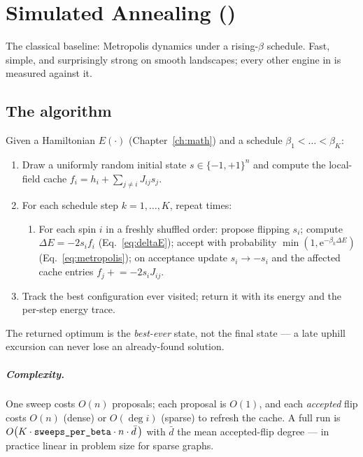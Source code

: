 \chapter{Simulated Annealing ()}
\label{ch:sa}

The classical baseline: Metropolis dynamics under a rising-$\beta$ schedule.
Fast, simple, and surprisingly strong on smooth landscapes; every other
engine in \qv{} is measured against it.

\section{The algorithm}

Given a Hamiltonian $E(\cdot)$ (Chapter~\ref{ch:math}) and a schedule
$\beta_1<\dots<\beta_K$:

\begin{keyeq}
\begin{enumerate}
\item Draw a uniformly random initial state $s\in\{-1,+1\}^n$ and compute the
local-field cache $f_i=h_i+\sum_{j\ne i}J_{ij}s_j$.
\item For each schedule step $k=1,\dots,K$, repeat
 times:
  \begin{enumerate}
  \item[a.] For each spin $i$ in a freshly shuffled order:
  propose flipping $s_i$; compute $\Delta E=-2s_if_i$
  (Eq.~\eqref{eq:deltaE}); accept with probability
  $\min(1,\mathrm{e}^{-\beta_k\Delta E})$
  (Eq.~\eqref{eq:metropolis}); on acceptance update $s_i\to-s_i$ and the
  affected cache entries $f_j\mathrel{+}=-2s_iJ_{ij}$.
  \end{enumerate}
\item Track the best configuration ever visited; return it with its energy
and the per-step energy trace.
\end{enumerate}
\end{keyeq}

The returned optimum is the \emph{best-ever} state, not the final state ---
a late uphill excursion can never lose an already-found solution.

\paragraph{Complexity.} One sweep costs $O(n)$ proposals; each proposal is
$O(1)$, and each \emph{accepted} flip costs $O(n)$ (dense) or $O(\deg i)$
(sparse) to refresh the cache. A full run is
$O\!\left(K\cdot\code{sweeps\_per\_beta}\cdot n\cdot \bar d\,\right)$ with
$\bar d$ the mean accepted-flip degree --- in practice linear in problem size
for sparse graphs.

